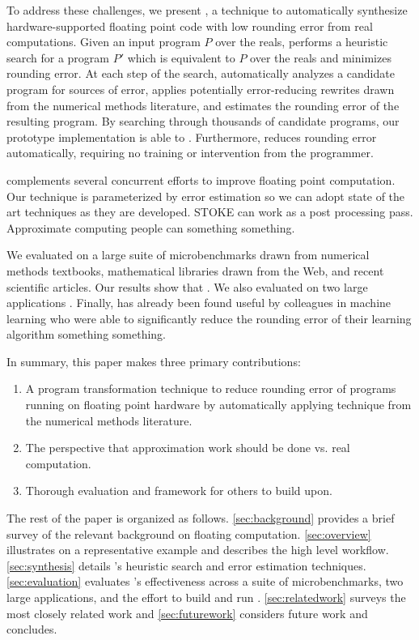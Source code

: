\documentclass[paper.tex]{subfiles}
\begin{document}
To address these challenges, we present \casio, a technique to
automatically synthesize hardware-supported floating point code with
low rounding error  from real computations.  Given an
input program $P$ over the reals, \casio performs a heuristic search
for a program $P'$ which is equivalent to $P$ over the reals and
minimizes rounding error.  At each step of the search, \casio
automatically analyzes a candidate program for sources of error,
applies potentially error-reducing rewrites drawn from the numerical
methods literature, and estimates the rounding error of the resulting
program.  By searching through thousands of candidate programs, our
prototype implementation is able to .  Furthermore, \casio reduces rounding error
automatically, requiring no training or intervention from the
programmer.

\casio complements several concurrent efforts to improve floating
point computation.  Our technique is parameterized by error estimation
so we can adopt state of the art techniques as they are developed.
STOKE can work as a post processing pass.  Approximate computing
people can something something.

We evaluated \casio on a large suite of microbenchmarks drawn from
numerical methods textbooks, mathematical libraries drawn from the
Web, and recent scientific articles.  Our results show that \casio
{}.  We also evaluated \casio on two large applications
.  Finally, \casio has already been found useful by
colleagues in machine learning who were able to significantly reduce
the rounding error of their learning algorithm something something.

In summary, this paper makes three primary contributions:
\begin{enumerate}
\item A program transformation technique to reduce rounding error of
  programs running on floating point hardware by automatically
  applying technique from the numerical methods literature.
\item The perspective that approximation work should be done vs. real
  computation.
\item Thorough evaluation and framework for others to build upon.
\end{enumerate}

The rest of the paper is organized as follows.  \cref{sec:background}
provides a brief survey of the relevant background on floating
computation.  \cref{sec:overview} illustrates \casio on a
representative example and describes the high level \casio workflow.
\cref{sec:synthesis} details \casio's heuristic search and error
estimation techniques.  \cref{sec:evaluation} evaluates \casio's
effectiveness across a suite of microbenchmarks, two large
applications, and the effort to build and run \casio.
\cref{sec:relatedwork} surveys the most closely related work and
\cref{sec:futurework} considers future work and concludes.
\end{document}
